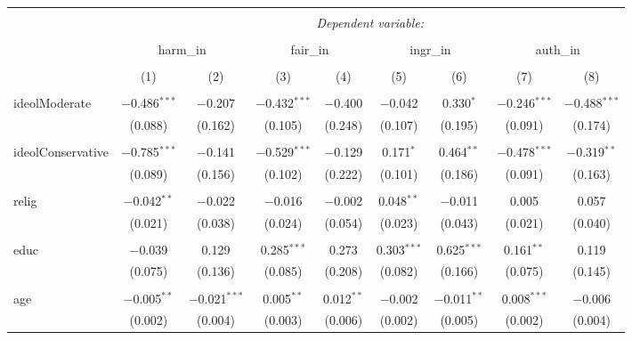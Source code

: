 
\begin{table}[!htbp] \centering 
  \caption{} 
  \label{} 
\begin{tabular}{@{\extracolsep{5pt}}lcccccccc} 
\\[-1.8ex]\hline 
\hline \\[-1.8ex] 
 & \multicolumn{8}{c}{\textit{Dependent variable:}} \\ 
\cline{2-9} 
\\[-1.8ex] & \multicolumn{2}{c}{harm\_in} & \multicolumn{2}{c}{fair\_in} & \multicolumn{2}{c}{ingr\_in} & \multicolumn{2}{c}{auth\_in} \\ 
\\[-1.8ex] & (1) & (2) & (3) & (4) & (5) & (6) & (7) & (8)\\ 
\hline \\[-1.8ex] 
 ideolModerate & $-$0.486$^{***}$ & $-$0.207 & $-$0.432$^{***}$ & $-$0.400 & $-$0.042 & 0.330$^{*}$ & $-$0.246$^{***}$ & $-$0.488$^{***}$ \\ 
  & (0.088) & (0.162) & (0.105) & (0.248) & (0.107) & (0.195) & (0.091) & (0.174) \\ 
  & & & & & & & & \\ 
 ideolConservative & $-$0.785$^{***}$ & $-$0.141 & $-$0.529$^{***}$ & $-$0.129 & 0.171$^{*}$ & 0.464$^{**}$ & $-$0.478$^{***}$ & $-$0.319$^{**}$ \\ 
  & (0.089) & (0.156) & (0.102) & (0.222) & (0.101) & (0.186) & (0.091) & (0.163) \\ 
  & & & & & & & & \\ 
 relig & $-$0.042$^{**}$ & $-$0.022 & $-$0.016 & $-$0.002 & 0.048$^{**}$ & $-$0.011 & 0.005 & 0.057 \\ 
  & (0.021) & (0.038) & (0.024) & (0.054) & (0.023) & (0.043) & (0.021) & (0.040) \\ 
  & & & & & & & & \\ 
 educ & $-$0.039 & 0.129 & 0.285$^{***}$ & 0.273 & 0.303$^{***}$ & 0.625$^{***}$ & 0.161$^{**}$ & 0.119 \\ 
  & (0.075) & (0.136) & (0.085) & (0.208) & (0.082) & (0.166) & (0.075) & (0.145) \\ 
  & & & & & & & & \\ 
 age & $-$0.005$^{**}$ & $-$0.021$^{***}$ & 0.005$^{**}$ & 0.012$^{**}$ & $-$0.002 & $-$0.011$^{**}$ & 0.008$^{***}$ & $-$0.006 \\ 
  & (0.002) & (0.004) & (0.003) & (0.006) & (0.002) & (0.005) & (0.002) & (0.004) \\ 

\end{tabular}
\end{table}
